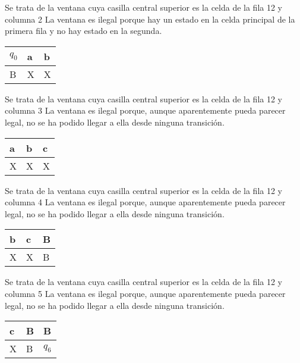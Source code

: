 ﻿\documentclass[a4paper,10pt]{article}
\begin{document}
Se trata de la ventana cuya casilla central superior es la celda de la fila 12 y columna 2\newline
La ventana es ilegal porque hay un estado en la celda principal de la primera fila y no hay estado en la segunda.\newline
\begin{table}[h!]
\centering
\begin{tabular}{|l|l|l|}
\hline
	$q_0$  &   a   &   b	\\ \hline
	B   &   X   &   X	\\ \hline
\end{tabular}
\end{table}

Se trata de la ventana cuya casilla central superior es la celda de la fila 12 y columna 3\newline
La ventana es ilegal porque, aunque aparentemente pueda parecer legal, no se ha podido llegar a ella desde ninguna transición.\newline
\begin{table}[h!]
\centering
\begin{tabular}{|l|l|l|}
\hline
	a   &   b   &   c	\\ \hline
	X   &   X   &   X	\\ \hline
\end{tabular}
\end{table}

Se trata de la ventana cuya casilla central superior es la celda de la fila 12 y columna 4\newline
La ventana es ilegal porque, aunque aparentemente pueda parecer legal, no se ha podido llegar a ella desde ninguna transición.\newline
\begin{table}[h!]
\centering
\begin{tabular}{|l|l|l|}
\hline
	b   &   c   &   B	\\ \hline
	X   &   X   &   B	\\ \hline
\end{tabular}
\end{table}

Se trata de la ventana cuya casilla central superior es la celda de la fila 12 y columna 5\newline
La ventana es ilegal porque, aunque aparentemente pueda parecer legal, no se ha podido llegar a ella desde ninguna transición.\newline
\begin{table}[h!]
\centering
\begin{tabular}{|l|l|l|}
\hline
	c   &   B   &   B	\\ \hline
	X   &   B   &   $q_6$	\\ \hline
\end{tabular}
\end{table}
\end{document}
